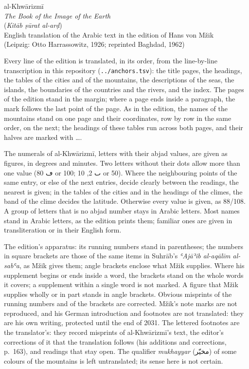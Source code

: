 \documentclass[11pt]{article}
\begin{document}
\begin{center}{\LARGE al-Khwārizmī}\\[3mm]
{\Large \textit{The Book of the Image of the Earth}}\\[2mm]
{\large (\textit{Kitāb ṣūrat al-arḍ})}\\[4mm]
English translation of the Arabic text in the edition of Hans von Mžik\\
(Leipzig: Otto Harrassowitz, 1926; reprinted Baghdad, 1962)\end{center}
\medskip
{\small Every line of the edition is translated, in its order, from the line-by-line transcription in this repository
(\texttt{../anchors.tsv}): the title pages, the headings, the tables of the cities and of the mountains, the
descriptions of the seas, the islands, the boundaries of the countries and the rivers, and the index. The pages of the
edition stand in the margin; where a page ends inside a paragraph, the mark follows the last point of the page. As in
the edition, the names of the mountains stand on one page and their coordinates, row by row in the same order, on the
next; the headings of these tables run across both pages, and their halves are marked with \dots.

The numerals of al-Khwārizmī, letters with their abjad values, are given as figures, in degrees and minutes. Two
letters without their dots allow more than one value (\textarabic{ڡ} 80 or 100; \textarabic{ٮ} 2, 10 or 50). Where the
neighbouring points of the same entry, or else of the next entries, decide clearly between the readings, the nearest
is given; in the tables of the cities and in the headings of the climes, the band of the clime decides the latitude. Otherwise every value is given, as
88/108\textdegree. A group of letters that is no abjad number stays in Arabic letters. Most names stand in Arabic
letters, as the edition prints them; familiar ones are given in transliteration or in their English form.

The edition's apparatus: its running numbers stand in parentheses; the numbers in square brackets are those of the
same items in Suhrāb's \textit{ʿAjāʾib al-aqālīm al-sabʿa}, as Mžik gives them; angle brackets enclose what Mžik
supplies. Where his supplement begins or ends inside a word, the brackets stand on the whole words it covers; a
supplement within a single word is not marked. A figure that Mžik supplies wholly or in part stands in angle
brackets. Obvious misprints of the running numbers and of the brackets are corrected. Mžik's note marks are not
reproduced, and his German introduction and footnotes are not translated: they are his own writing, protected until
the end of 2031. The lettered footnotes are the translator's: they record misprints of al-Khwārizmī's text, the
editor's corrections of it that the translation follows (his additions and corrections, p.~163), and readings that
stay open. The qualifier \textit{mukhayyar} (\textarabic{مخيّر}) of some colours of the mountains is left
untranslated; its sense here is not certain.

}
\end{document}
